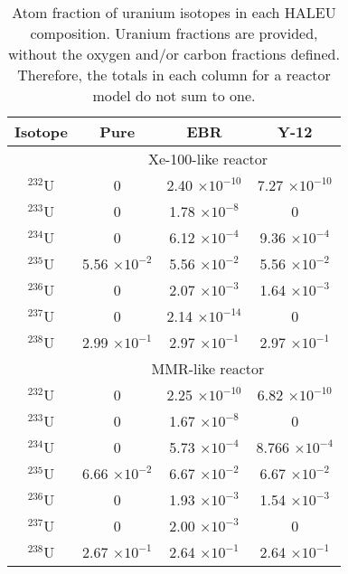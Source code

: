 \begin{table}[ht]
        \centering 
        \caption{Atom fraction of uranium isotopes in each \gls{HALEU}
        composition. Uranium fractions are provided, without the oxygen 
        and/or carbon fractions defined. Therefore, the totals in each 
        column for a reactor model do not sum to one.}
        \label{tab:u_comps}
        \begin{tabular}{c c c c}
                \hline
                Isotope & Pure & \gls{EBR} & Y-12 \\
                \hline
                & \multicolumn{3}{c}{Xe-100-like reactor} \\
                $^{232}$U & 0 & 2.40 $\times 10^{-10}$ & 7.27 $\times 10^{-10}$ \\
                $^{233}$U & 0 & 1.78 $\times 10^{-8}$ & 0 \\
                $^{234}$U & 0 & 6.12 $\times 10^{-4}$ & 9.36 $\times 10^{-4}$\\
                $^{235}$U & 5.56 $\times 10^{-2}$ & 5.56 $\times 10^{-2}$ & 5.56 $\times 10^{-2}$\\
                $^{236}$U & 0 & 2.07 $\times 10^{-3}$ & 1.64 $\times 10^{-3}$ \\
                $^{237}$U & 0 & 2.14 $\times 10^{-14}$ & 0 \\
                $^{238}$U & 2.99 $\times 10^{-1}$ & 2.97 $\times 10^{-1}$ & 2.97 $\times 10^{-1}$ \\
                \hline 
                & \multicolumn{3}{c}{MMR-like reactor} \\
                $^{232}$U & 0 & 2.25 $\times 10^{-10}$ & 6.82 $\times 10^{-10}$ \\
                $^{233}$U & 0 & 1.67 $\times 10^{-8}$ & 0 \\
                $^{234}$U & 0 & 5.73 $\times 10^{-4}$ & 8.766 $\times 10^{-4}$ \\
                $^{235}$U & 6.66 $\times 10^{-2}$ & 6.67 $\times 10^{-2}$ & 6.67 $\times 10^{-2}$ \\
                $^{236}$U & 0 & 1.93 $\times 10^{-3}$ & 1.54 $\times 10^{-3}$ \\
                $^{237}$U & 0 & 2.00 $\times 10^{-3}$ & 0 \\
                $^{238}$U & 2.67 $\times 10^{-1}$ & 2.64 $\times 10^{-1}$ & 2.64 $\times 10^{-1}$ \\
                \hline
        \end{tabular}
\end{table}

